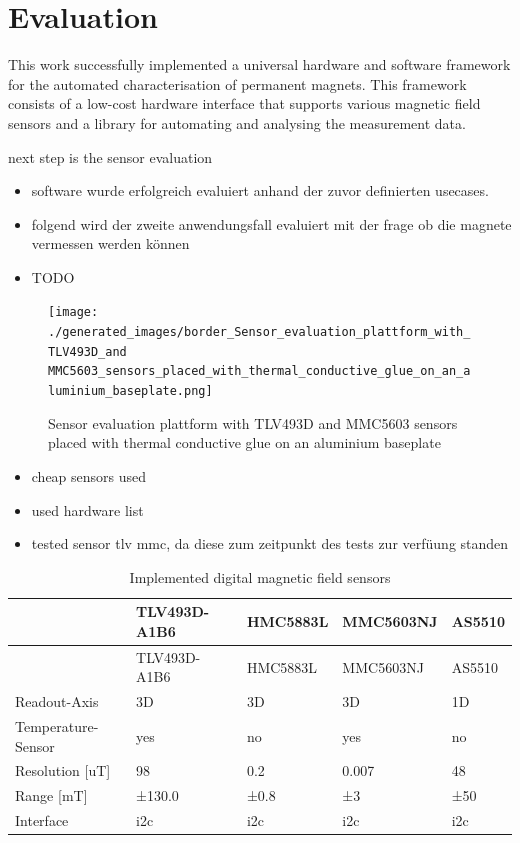 \hypertarget{evaluation}{%
\chapter{Evaluation}\label{evaluation}}

This work successfully implemented a universal hardware and software
framework for the automated characterisation of permanent magnets. This
framework consists of a low-cost hardware interface that supports
various magnetic field sensors and a library for automating and
analysing the measurement data.

next step is the sensor evaluation

\begin{itemize}
\tightlist
\item
  software wurde erfolgreich evaluiert anhand der zuvor definierten
  usecases.
\item
  folgend wird der zweite anwendungsfall evaluiert mit der frage ob die
  magnete vermessen werden können
\item
  TODO
\end{itemize}

\begin{figure}
\centering
\texttt{[image: ./generated\_images/border\_Sensor\_evaluation\_plattform\_with\_TLV493D\_and MMC5603\_sensors\_placed\_with\_thermal\_conductive\_glue\_on\_an\_aluminium\_baseplate.png]}
\caption{Sensor evaluation plattform with TLV493D and MMC5603 sensors
placed with thermal conductive glue on an aluminium baseplate
\label{Sensor_evaluation_plattform_with_TLV493D_and MMC5603_sensors_placed_with_thermal_conductive_glue_on_an_aluminium_baseplate.png}}
\end{figure}

\begin{itemize}
\tightlist
\item
  cheap sensors used
\item
  used hardware list
\item
  tested sensor tlv mmc, da diese zum zeitpunkt des tests zur verfüung
  standen
\end{itemize}

\begin{longtable}[]{@{}lllll@{}}
\caption{Implemented digital magnetic field sensors
\label{Implemented_digital_magnetic_field_sensors.csv}}\tabularnewline
\toprule
& TLV493D-A1B6 & HMC5883L & MMC5603NJ & AS5510\tabularnewline
\midrule
\endfirsthead
\toprule
& TLV493D-A1B6 & HMC5883L & MMC5603NJ & AS5510\tabularnewline
\midrule
\endhead
Readout-Axis & 3D & 3D & 3D & 1D\tabularnewline
Temperature-Sensor & yes & no & yes & no\tabularnewline
Resolution {[}uT{]} & 98 & 0.2 & 0.007 & 48\tabularnewline
Range {[}mT{]} & ±130.0 & ±0.8 & ±3 & ±50\tabularnewline
Interface & \gls{i2c} & \gls{i2c} & \gls{i2c} & \gls{i2c}\tabularnewline
\bottomrule
\end{longtable}

